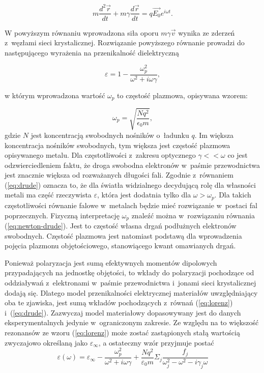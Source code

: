 \begin{equation}
m \frac{d^2\vec{r}}{dt} + m \gamma \frac{d\vec{r}}{dt} = q \vec{E_0}e^{i\omega t}.
\label{eq:newton-drude}
\end{equation}

W powyższym równaniu wprowadzona siła oporu $m \gamma \vec{v}$ wynika ze zderzeń z~węzłami sieci krystalicznej. Rozwiązanie powyższego równanie prowadzi do następującego wyrażenia na przenikalność dielektryczną

\begin{equation}
\varepsilon= 1 - \frac{\omega_p^2}{\omega^2+i\omega \gamma},
\label{eq:drude}
\end{equation}

w którym wprowadzona wartość $\omega_p$ to częstość plazmowa, opisywana wzorem:

\begin{equation}
\omega_p = \sqrt{\frac{N q^2}{\epsilon_0 m}},
\label{eq:omega-plazmowa}
\end{equation}
gdzie $N$ jest koncentracją swobodnych nośników o~ładunku $q$. Im większa koncentracja nośników swobodnych, tym większa jest częstość plazmowa opisywanego metalu.  Dla częstotliwości z~zakresu optycznego $\gamma<<\omega$ co jest odzwierciedleniem faktu, że droga swobodna elektronów w~paśmie przewodnictwa jest znacznie większa od rozważanych długości fali. Zgodnie z~równaniem  (\ref{eq:drude}) oznacza to, że dla światła widzialnego decydującą rolę dla własności metali ma część rzeczywista $\varepsilon$, która jest dodatnia tylko dla $\omega>\omega_p$. Dla takich częstotliwości równanie falowe w~metalach będzie mieć rozwiązanie w~postaci fal poprzecznych. Fizyczną interpretację $\omega_p$ znaleźć można w~rozwiązaniu równania (\ref{eq:newton-drude}). Jest to częstość własna drgań podłużnych elektronów swobodnych. Częstość plazmowa jest natomiast podstawą dla wprowadzenia pojęcia plazmonu objętościowego, stanowiącego kwant omawianych drgań.

Ponieważ polaryzacja jest sumą efektywnych momentów dipolowych przypadających na jednostkę objętości, to wkłady do polaryzacji pochodzące od oddziaływań z~elektronami w~paśmie przewodnictwa i~jonami sieci krystalicznej dodają się. Dlatego model przenikalności elektrycznej materiałów uwzględniający oba te zjawiska, jest sumą wkładów pochodzących z~równań (\ref{eq:lorenz}) i~(\ref{eq:drude}). Zazwyczaj model materiałowy dopasowywany jest do danych eksperymentalnych jedynie w~ograniczonym zakresie. Ze względu na to większość rezonansów ze wzoru (\ref{eq:lorenz}) może zostać zastąpionych stałą wartością zwyczajowo określaną jako $\varepsilon_\infty$, a ostateczny wzór przyjmuje postać
\begin{equation}
\varepsilon(\omega)=\varepsilon_\infty- \frac{\omega_p^2}{\omega^2+i\omega\gamma} +\frac{Nq^2}{\varepsilon_0 m} \Sigma_j \frac{f_j}{\omega_j^2-\omega^2-i\gamma_j\omega}
\label{eq:lorenz-drude}
\end{equation}
